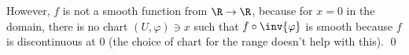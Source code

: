 \documentclass[12pt,letterpaper]{article}
\let\temp\phi
\let\phi\varphi
\let\varphi\temp
\begin{document}
\begin{enumerate}
However, $f$ is not a smooth function from $\R\to\R$, because for $x=0$ in the domain, there is no chart $(U,\phi)\ni x$ such that $f\circ\inv{\phi}$ is smooth because $f$ is discontinuous at 0 (the choice of chart for the range doesn't help with this). \qed

\end{enumerate}
\end{document}
